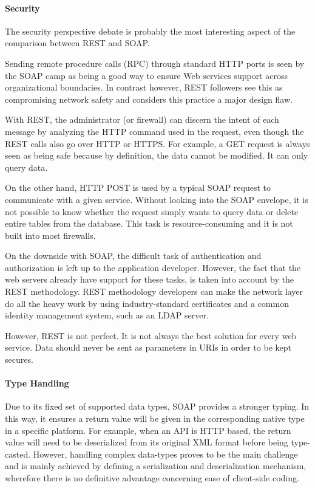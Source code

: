 \paragraph{Security}
The security perspective debate is probably the most interesting aspect of the comparison between REST and SOAP. 

Sending remote procedure calls (RPC) through standard HTTP ports is seen by the SOAP camp as being a good way to ensure Web services support across organizational boundaries. In contrast however, REST followers see this as compromising network safety and considers this practice a major design flaw.

With REST, the administrator (or firewall) can discern the intent of each message by analyzing the HTTP command used in the request, even though the REST calls also go over HTTP or HTTPS. For example, a GET request is always seen as being safe because by definition, the data cannot be modified. It can only query data.

On the other hand, HTTP POST is used by a typical SOAP request to communicate with a given service. Without looking into the SOAP envelope, it is not possible to know whether the request simply wants to query data or delete entire tables from the database. This task is resource-consuming and it is not built into most firewalls.

On the downside with SOAP, the difficult task of authentication and authorization is left up to the application developer. However, the fact that the web servers already have support for these tasks, is taken into account by the REST methodology. REST methodology developers can make the network layer do all the heavy work by using industry-standard certificates and a common identity management system, such as an LDAP server.

However, REST is not perfect. It is not always the best solution for every web service. Data should never be sent as parameters in URIs in order to be kept secures. 

\paragraph{Type Handling}

Due to its fixed set of supported data types, SOAP provides a stronger typing. In this way, it ensures a return value  will be given in the corresponding native type in a specific platform. For example, when an API is HTTP based, the return value will need to be deserialized from its original XML format before being type-casted.    
However, handling complex data-types proves to be the main challenge and is mainly achieved by defining a serialization and deserialization mechanism, wherefore there is no definitive advantage concerning ease of client-side coding. 



